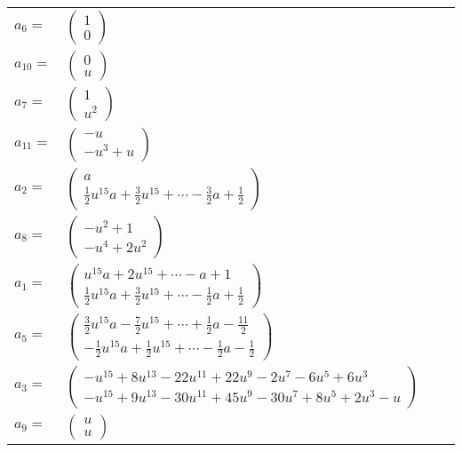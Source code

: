 \documentclass[1p]{elsarticle_modified}
\theoremstyle{definition}
\begin{document}
\begin{tabular}{m{7pt} m{180pt} m{7pt} m{180pt} }
\flushright $a_{6}=$&$\begin{pmatrix}1\\0\end{pmatrix}$ \\
\flushright $a_{10}=$&$\begin{pmatrix}0\\u\end{pmatrix}$ \\
\flushright $a_{7}=$&$\begin{pmatrix}1\\u^2\end{pmatrix}$ \\
\flushright $a_{11}=$&$\begin{pmatrix}- u\\- u^3+u\end{pmatrix}$ \\
\flushright $a_{2}=$&$\begin{pmatrix}a\\\frac{1}{2} u^{15} a+\frac{3}{2} u^{15}+\cdots-\frac{3}{2} a+\frac{1}{2}\end{pmatrix}$ \\
\flushright $a_{8}=$&$\begin{pmatrix}- u^2+1\\- u^4+2 u^2\end{pmatrix}$ \\
\flushright $a_{1}=$&$\begin{pmatrix}u^{15} a+2 u^{15}+\cdots- a+1\\\frac{1}{2} u^{15} a+\frac{3}{2} u^{15}+\cdots-\frac{1}{2} a+\frac{1}{2}\end{pmatrix}$ \\
\flushright $a_{5}=$&$\begin{pmatrix}\frac{3}{2} u^{15} a-\frac{7}{2} u^{15}+\cdots+\frac{1}{2} a-\frac{11}{2}\\-\frac{1}{2} u^{15} a+\frac{1}{2} u^{15}+\cdots-\frac{1}{2} a-\frac{1}{2}\end{pmatrix}$ \\
\flushright $a_{3}=$&$\begin{pmatrix}- u^{15}+8 u^{13}-22 u^{11}+22 u^9-2 u^7-6 u^5+6 u^3\\- u^{15}+9 u^{13}-30 u^{11}+45 u^9-30 u^7+8 u^5+2 u^3- u\end{pmatrix}$ \\
\flushright $a_{9}=$&$\begin{pmatrix}u\\u\end{pmatrix}$ \\

\end{tabular}
\end{document}
